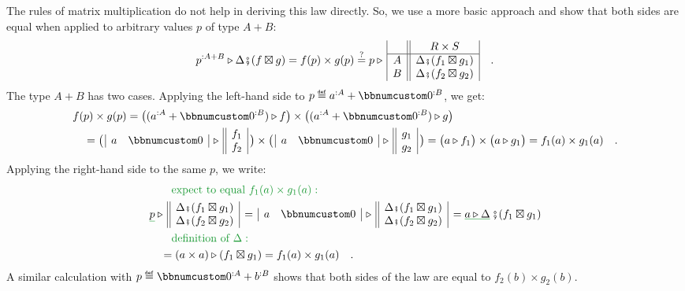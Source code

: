The rules of matrix multiplication do not help in deriving this law
directly. So, we use a more basic approach and show that both sides
are equal when applied to arbitrary values $p$ of type $A+B$:
\[
p^{:A+B}\triangleright\Delta\bef(f\boxtimes g)=f(p)\times g(p)\overset{?}{=}p\triangleright\,\begin{array}{|c||c|}
 & R\times S\\
\hline A & \Delta\bef(f_{1}\boxtimes g_{1})\\
B & \Delta\bef(f_{2}\boxtimes g_{2})
\end{array}\quad.
\]
The type $A+B$ has two cases. Applying the left-hand side to $p\triangleq a^{:A}+\bbnum 0^{:B}$,
we get:
\begin{align*}
 & f(p)\times g(p)=\big((a^{:A}+\bbnum 0^{:B})\triangleright f\big)\times\big((a^{:A}+\bbnum 0^{:B})\triangleright g\big)\\
 & \quad=\big(\,\begin{array}{|cc|}
a & \bbnum 0\end{array}\,\triangleright\,\begin{array}{||c|}
f_{1}\\
f_{2}
\end{array}\,\big)\times\big(\,\begin{array}{|cc|}
a & \bbnum 0\end{array}\,\triangleright\,\begin{array}{||c|}
g_{1}\\
g_{2}
\end{array}\,\big)=\big(a\triangleright f_{1}\big)\times\big(a\triangleright g_{1}\big)=f_{1}(a)\times g_{1}(a)\quad.
\end{align*}
Applying the right-hand side to the same $p$, we write:
\begin{align*}
 & \quad{\color{greenunder}\quad\text{expect to equal }f_{1}(a)\times g_{1}(a):}\quad\\
 & \gunderline p\triangleright\,\begin{array}{||c|}
\Delta\bef(f_{1}\boxtimes g_{1})\\
\Delta\bef(f_{2}\boxtimes g_{2})
\end{array}\,=\,\begin{array}{|cc|}
a & \bbnum 0\end{array}\,\triangleright\,\begin{array}{||c|}
\Delta\bef(f_{1}\boxtimes g_{1})\\
\Delta\bef(f_{2}\boxtimes g_{2})
\end{array}\,=\gunderline{a\triangleright\Delta}\,\bef(f_{1}\boxtimes g_{1})\\
 & \quad{\color{greenunder}\quad\text{definition of }\Delta:}\quad\\
 & \quad=(a\times a)\triangleright(f_{1}\boxtimes g_{1})=f_{1}(a)\times g_{1}(a)\quad.
\end{align*}
A similar calculation with $p\triangleq\bbnum 0^{:A}+b^{:B}$ shows
that both sides of the law are equal to $f_{2}(b)\times g_{2}(b)$.


